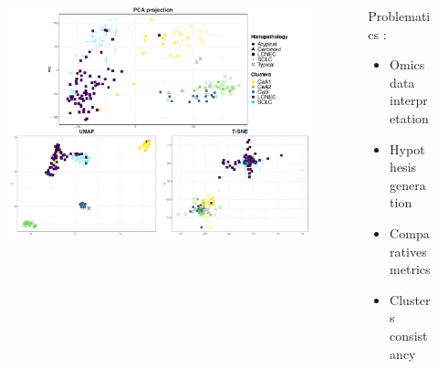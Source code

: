 \documentclass[compress]{beamer}
\begin{document}
\begin{frame}
\begin{overprint}
    \begin{columns}[c]
  \begin{column}{0.75\linewidth}
    \vspace*{-0.4cm}
  \begin{figure}
\centering
\includegraphics[height=0.75\linewidth]{figures/intro/RD3.pdf}
  \end{figure}
  \end{column}
  \hspace{-0.7cm}
  \begin{column}{0.25\linewidth}

  \hskip8pt 
    \textcolor{IARCblue}{Problematics : }
  \begin{itemize}
        \item Omics data interpretation
      \item Hypothesis generation 
      \item Comparatives metrics
      \item Clusters consistancy
  \end{itemize}
  \end{column}
 \end{columns} 
  
\end{overprint}


  \begin{flushright}
\color{IARCdblue}{ \scriptsize{\insertframenumber / \inserttotalframenumber}} \hspace*{2mm}
  \end{flushright}

\end{frame}
\end{document}
